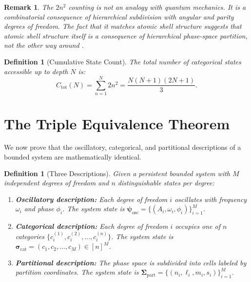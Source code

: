 \documentclass[11pt,twocolumn,a4paper]{article}
\newtheorem{definition}[theorem]{Definition}
\newtheorem{remark}[theorem]{Remark}
\begin{document}
\begin{remark}
The $2n^2$ counting is not an analogy with quantum mechanics. It is a
combinatorial consequence of hierarchical subdivision with angular and
parity degrees of freedom. The fact that it matches atomic shell
structure suggests that atomic shell structure itself is a consequence
of hierarchical phase-space partition, not the other way around
\citep{sakurai2017}.
\end{remark}

\begin{definition}[Cumulative State Count]
\label{def:cumulative}
The total number of categorical states accessible up to depth $N$ is:
\begin{equation}
C_{\mathrm{tot}}(N) = \sum_{n=1}^{N} 2n^2
  = \frac{N(N+1)(2N+1)}{3}.
\label{eq:cumulative-count}
\end{equation}
\end{definition}


\section{The Triple Equivalence Theorem}
\label{sec:triple-equivalence}

We now prove that the oscillatory, categorical, and partitional
descriptions of a bounded system are mathematically identical.

\begin{definition}[Three Descriptions]
\label{def:three-descriptions}
Given a persistent bounded system with $M$ independent degrees of
freedom and $n$ distinguishable states per degree:
\begin{enumerate}[label=(\roman*),leftmargin=*]
\item \textbf{Oscillatory description:} Each degree of freedom $i$
  oscillates with frequency $\omega_i$ and phase $\phi_i$. The system
  state is $\bm{\psi}_{\mathrm{osc}} = \{(A_i, \omega_i,
  \phi_i)\}_{i=1}^M$.
\item \textbf{Categorical description:} Each degree of freedom $i$
  occupies one of $n$ categories $\{c_i^{(1)}, c_i^{(2)}, \ldots,
  c_i^{(n)}\}$. The system state is $\bm{\sigma}_{\mathrm{cat}} =
  (c_1, c_2, \ldots, c_M) \in [n]^M$.
\item \textbf{Partitional description:} The phase space is subdivided
  into cells labeled by partition coordinates. The system state is
  $\bm{\Sigma}_{\mathrm{part}} = \{(n_i, \ell_i, m_i,
  s_i)\}_{i=1}^M$.
\end{enumerate}
\end{definition}
\end{document}
